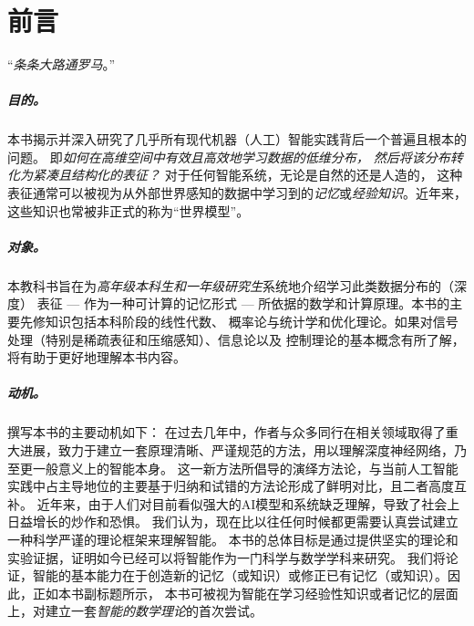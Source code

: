\documentclass[../../book-main_zh.tex]{subfiles}
\begin{document}
\chapter*{前言}

\begin{center}
    ``{\em 条条大路通罗马}。''

\end{center}
\vspace{5mm}

\paragraph{目的。}
本书揭示并深入研究了几乎所有现代机器（人工）智能实践背后一个普遍且根本的问题。
即{\em 如何在高维空间中有效且高效地学习数据的低维分布，
    然后将该分布转化为紧凑且结构化的表征？} 对于任何智能系统，无论是自然的还是人造的，
这种表征通常可以被视为从外部世界感知的数据中学习到的{\em 记忆}或{\em 经验知识}。近年来，这些知识也常被非正式的称为“世界模型”。

\paragraph{对象。}
本教科书旨在为{\em 高年级本科生和一年级研究生}系统地介绍学习此类数据分布的（深度）
表征 --- 作为一种可计算的记忆形式 --- 所依据的数学和计算原理。本书的主要先修知识包括本科阶段的线性代数、
概率论与统计学和优化理论。如果对信号处理（特别是稀疏表征和压缩感知）、信息论以及
控制理论的基本概念有所了解，将有助于更好地理解本书内容。

\paragraph{动机。}
撰写本书的主要动机如下： 在过去几年中，作者与众多同行在相关领域取得了重大进展，致力于建立一套原理清晰、严谨规范的方法，用以理解深度神经网络，乃至更一般意义上的智能本身。
这一新方法所倡导的演绎方法论，与当前人工智能实践中占主导地位的主要基于归纳和试错的方法论形成了鲜明对比，且二者高度互补。
近年来，由于人们对目前看似强大的AI模型和系统缺乏理解，导致了社会上日益增长的炒作和恐惧。
我们认为，现在比以往任何时候都更需要认真尝试建立一种科学严谨的理论框架来理解智能。
本书的总体目标是通过提供坚实的理论和实验证据，证明如今已经可以将智能作为一门科学与数学学科来研究。
我们将论证，智能的基本能力在于创造新的记忆（或知识）或修正已有记忆（或知识）。因此，正如本书副标题所示，
本书可被视为智能在学习经验性知识或者记忆的层面上，对建立一套{\em 智能的数学理论}的首次尝试。
\end{document}
